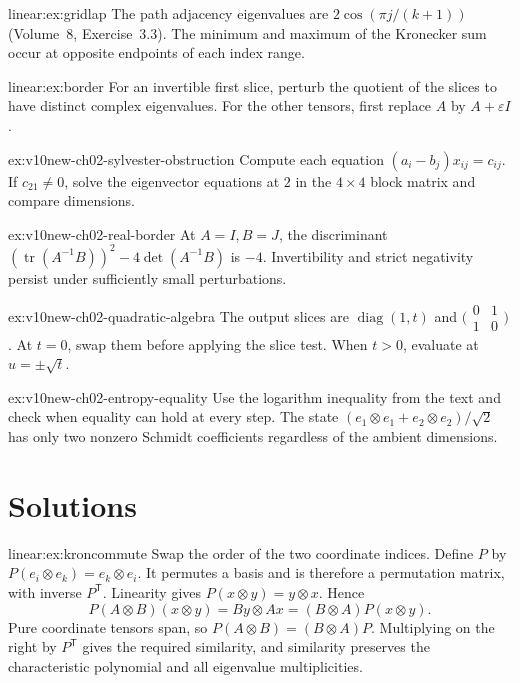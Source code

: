 \begin{hint}{linear:ex:gridlap}
The path adjacency eigenvalues are $2\cos(\pi j/(k+1))$ (Volume~8, Exercise~3.3). The minimum and maximum of the Kronecker sum occur at opposite endpoints of each index range.
\end{hint}
\begin{hint}{linear:ex:border}
For an invertible first slice, perturb the quotient of the slices to have distinct complex eigenvalues. For the other tensors, first replace $A$ by $A+\varepsilon I$.
\end{hint}
\begin{hint}{ex:v10new-ch02-sylvester-obstruction}
Compute each equation $(a_i-b_j)x_{ij}=c_{ij}$. If $c_{21}\ne0$, solve the eigenvector equations at $2$ in the $4\times4$ block matrix and compare dimensions.
\end{hint}
\begin{hint}{ex:v10new-ch02-real-border}
At $A=I,B=J$, the discriminant $(\operatorname{tr}(A^{-1}B))^2-4\det(A^{-1}B)$ is $-4$. Invertibility and strict negativity persist under sufficiently small perturbations.
\end{hint}
\begin{hint}{ex:v10new-ch02-quadratic-algebra}
The output slices are $\operatorname{diag}(1,t)$ and $\bigl(\begin{smallmatrix}0&1\\1&0\end{smallmatrix}\bigr)$. At $t=0$, swap them before applying the slice test. When $t>0$, evaluate at $u=\pm\sqrt t$.
\end{hint}
\begin{hint}{ex:v10new-ch02-entropy-equality}
Use the logarithm inequality from the text and check when equality can hold at every step. The state $(e_1\otimes e_1+e_2\otimes e_2)/\sqrt2$ has only two nonzero Schmidt coefficients regardless of the ambient dimensions.
\end{hint}

\section{Solutions}

\begin{solution}{linear:ex:kroncommute}
\idea Swap the order of the two coordinate indices.
\writeup Define $P$ by $P(e_i\otimes e_k)=e_k\otimes e_i$. It permutes a basis and is therefore a permutation matrix, with inverse $P^{\mathsf T}$. Linearity gives $P(x\otimes y)=y\otimes x$. Hence
\[
P(A\otimes B)(x\otimes y)=By\otimes Ax
 =(B\otimes A)P(x\otimes y).
\]
Pure coordinate tensors span, so $P(A\otimes B)=(B\otimes A)P$. Multiplying on the right by $P^{\mathsf T}$ gives the required similarity, and similarity preserves the characteristic polynomial and all eigenvalue multiplicities.
\end{solution}

